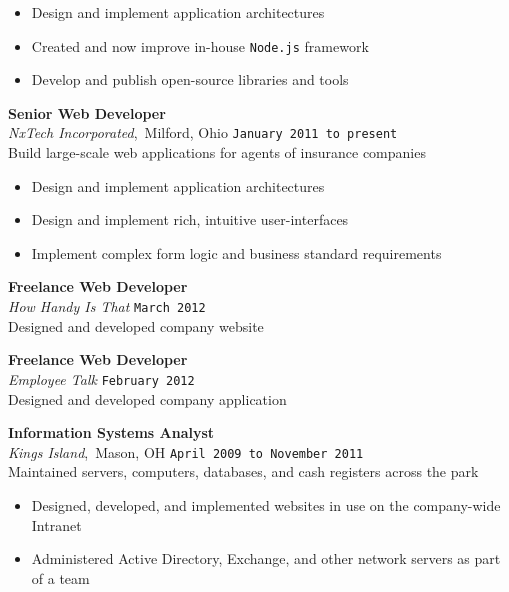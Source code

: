 \documentclass[11pt, line]{res}
\begin{document}
\begin{resume}
				\begin{itemize}
					\item Design and implement application architectures
					\item Created and now improve in-house \texttt{Node.js} framework
					\item Develop and publish open-source libraries and tools
				\end{itemize}

			\vspace{-4pt}
				\textbf{Senior Web Developer} \\
				\textit{NxTech Incorporated},\, Milford, Ohio
					\hfill \texttt{January 2011 to present} \\
				Build large-scale web applications for agents of insurance companies

				\begin{itemize}
					\item Design and implement application architectures
					\item Design and implement rich, intuitive user-interfaces
					\item Implement complex form logic and business standard requirements
				\end{itemize}

			\vspace{-4pt}
				\textbf{Freelance Web Developer} \\
				\textit{How Handy Is That}
					\hfill \texttt{March 2012} \\
				Designed and developed company website

			\vspace{-4pt}
				\textbf{Freelance Web Developer} \\
				\textit{Employee Talk}
					\hfill \texttt{February 2012} \\
				Designed and developed company application

			\vspace{-4pt}
				\textbf{Information Systems Analyst} \\
				\textit{Kings Island},\, Mason, OH
					\hfill \texttt{April 2009 to November 2011} \\
				Maintained servers, computers, databases, and cash registers across the park

				\begin{itemize}
					\item Designed, developed, and implemented websites in use on the company-wide Intranet
					\item Administered Active Directory, Exchange, and other network servers as part of a team
				\end{itemize}
	\end{resume}
\end{document}
